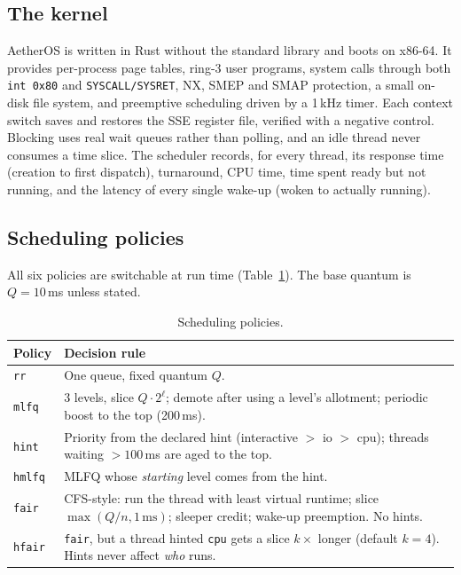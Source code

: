 \documentclass[10pt,twocolumn]{article}
\newcommand{\ms}{\,ms}
\newcommand{\pol}[1]{\texttt{#1}}
\begin{document}
\subsection{The kernel}
AetherOS is written in Rust without the standard library and boots on x86-64. It provides
per-process page tables, ring-3 user programs, system calls through both \texttt{int 0x80}
and \texttt{SYSCALL/SYSRET}, NX, SMEP and SMAP protection, a small on-disk file system, and
preemptive scheduling driven by a 1\,kHz timer. Each context switch saves and restores the
SSE register file, verified with a negative control. Blocking uses real wait queues rather
than polling, and an idle thread never consumes a time slice. The scheduler records, for
every thread, its response time (creation to first dispatch), turnaround, CPU time, time spent
ready but not running, and the latency of every single wake-up (woken to actually running).

\subsection{Scheduling policies}
All six policies are switchable at run time (Table~\ref{tab:policies}). The base quantum is
$Q=10$\ms{} unless stated.

\begin{table}[t]
\centering\small
\begin{tabular}{@{}lp{5.2cm}@{}}
\toprule
Policy & Decision rule \\ \midrule
\pol{rr} & One queue, fixed quantum $Q$. \\
\pol{mlfq} & 3 levels, slice $Q\cdot2^{\ell}$; demote after using a level's allotment;
periodic boost to the top (200\ms). \\
\pol{hint} & Priority from the declared hint (interactive $>$ io $>$ cpu); threads waiting
$>100$\ms{} are aged to the top. \\
\pol{hmlfq} & MLFQ whose \emph{starting} level comes from the hint. \\
\pol{fair} & CFS-style: run the thread with least virtual runtime; slice
$\max(Q/n,1\,\text{ms})$; sleeper credit; wake-up preemption. No hints. \\
\pol{hfair} & \pol{fair}, but a thread hinted \texttt{cpu} gets a slice $k\times$ longer
(default $k=4$). Hints never affect \emph{who} runs. \\ \bottomrule
\end{tabular}
\caption{Scheduling policies.}\label{tab:policies}
\end{table}
\end{document}
